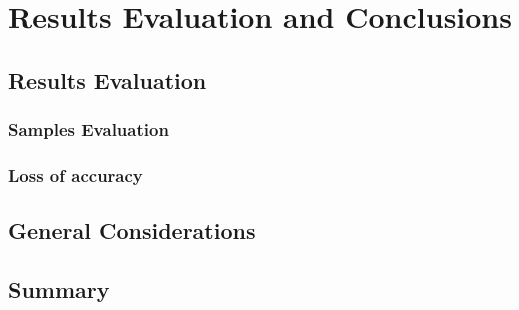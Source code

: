 \chapter{Results Evaluation and Conclusions}
\section{Results Evaluation}
\subsection{Samples Evaluation}
\subsection{Loss of accuracy}
\section{General Considerations}
\label{sec:considerations}



\section{Summary}